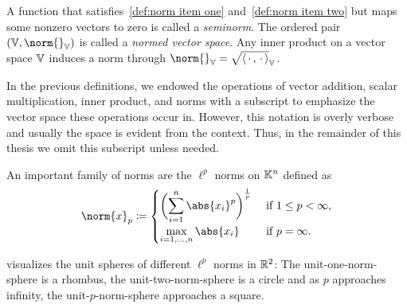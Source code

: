 A function that satisfies~\cref{def:norm item one} and~\cref{def:norm item two} but maps some nonzero vectors to zero is called a \emph{seminorm}.
The ordered pair \( (\V, \norm{}_{\V}) \) is called a \emph{normed vector space}.
Any inner product on a vector space \( \mathbb{V} \) induces a norm through \( \norm{}_{\V} = \sqrt{\inprod{\argm}{\argm}}_{\V} \).

In the previous definitions, we endowed the operations of vector addition, scalar multiplication, inner product, and norms with a subscript to emphasize the vector space these operations occur in.
However, this notation is overly verbose and usually the space is evident from the context.
Thus, in the remainder of this thesis we omit this subscript unless needed.

An important family of norms are the \( \ell^p \) norms on \( \mathbb{K}^n \) defined as
\begin{equation}
	\norm{x}_{p} \coloneqq \begin{cases}
		\displaystyle\biggl( \sum_{i=\num{1}}^n \abs{x_i}^p\biggr)^{\frac{1}{p}} &\ \text{if}\ \num{1} \leq p < \infty, \\
		\displaystyle\max_{i=\num{1},\dotsc,n} \abs{x_i} &\ \text{if}\ p = \infty.
	\end{cases}
\end{equation}
\begin{sidefigure}
	\caption[Unit spheres of \( p \)-norms]{%
		Unit spheres of different \( p \)-norms in \( \R^{\num{2}} \).
	}%
	\label{fig:norm balls}
\end{sidefigure}
 visualizes the unit spheres of different \( \ell^p \) norms in \( \R^{\num{2}} \):
The unit-one-norm-sphere is a rhombus, the unit-two-norm-sphere is a circle and as \( p \) approaches infinity, the unit-\( p \)-norm-sphere approaches a square.
